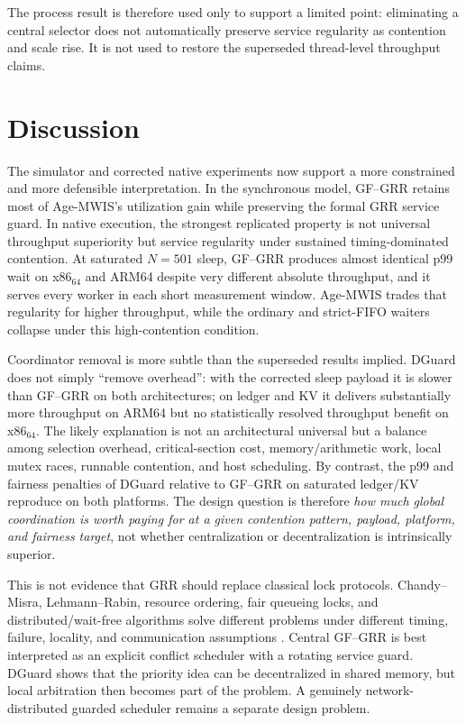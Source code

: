 \documentclass[10pt,journal]{IEEEtran}
\begin{document}
The process result is therefore used only to support a limited point: eliminating a central selector does not automatically preserve service regularity as contention and scale rise. It is not used to restore the superseded thread-level throughput claims.

\section{Discussion}
The simulator and corrected native experiments now support a more constrained and more defensible interpretation. In the synchronous model, GF--GRR retains most of Age-MWIS's utilization gain while preserving the formal GRR service guard. In native execution, the strongest replicated property is not universal throughput superiority but service regularity under sustained timing-dominated contention. At saturated $N=501$ sleep, GF--GRR produces almost identical p99 wait on x86$_{64}$ and ARM64 despite very different absolute throughput, and it serves every worker in each short measurement window. Age-MWIS trades that regularity for higher throughput, while the ordinary and strict-FIFO waiters collapse under this high-contention condition.

Coordinator removal is more subtle than the superseded results implied. DGuard does not simply ``remove overhead'': with the corrected sleep payload it is slower than GF--GRR on both architectures; on ledger and KV it delivers substantially more throughput on ARM64 but no statistically resolved throughput benefit on x86$_{64}$. The likely explanation is not an architectural universal but a balance among selection overhead, critical-section cost, memory/arithmetic work, local mutex races, runnable contention, and host scheduling. By contrast, the p99 and fairness penalties of DGuard relative to GF--GRR on saturated ledger/KV reproduce on both platforms. The design question is therefore \emph{how much global coordination is worth paying for at a given contention pattern, payload, platform, and fairness target}, not whether centralization or decentralization is intrinsically superior.

This is not evidence that GRR should replace classical lock protocols. Chandy--Misra, Lehmann--Rabin, resource ordering, fair queueing locks, and distributed/wait-free algorithms solve different problems under different timing, failure, locality, and communication assumptions \cite{lehmann1981,chandy1984,bendavid2025}. Central GF--GRR is best interpreted as an explicit conflict scheduler with a rotating service guard. DGuard shows that the priority idea can be decentralized in shared memory, but local arbitration then becomes part of the problem. A genuinely network-distributed guarded scheduler remains a separate design problem.
\end{document}
